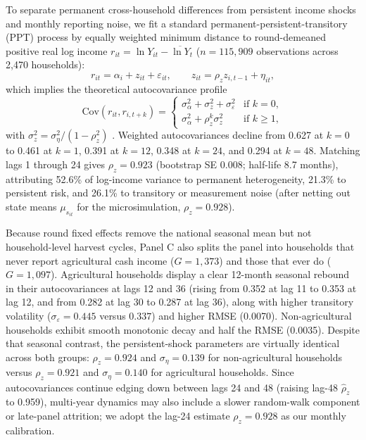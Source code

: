 \documentclass[11pt]{article}
\begin{document}
To separate permanent cross-household differences from persistent income shocks and monthly reporting noise, we fit a standard permanent-persistent-transitory (PPT) process by equally weighted minimum distance to round-demeaned positive real log income $r_{it} = \ln Y_{it} - \overline{\ln Y}_t$ ($n = 115{,}909$ observations across 2,470 households):
\begin{equation}\label{eq:ppt}
r_{it} = \alpha_i + z_{it} + \varepsilon_{it}, \qquad z_{it} = \rho_z z_{i,t-1} + \eta_{it},
\end{equation}
which implies the theoretical autocovariance profile
\begin{equation}\label{eq:autocov}
\text{Cov}(r_{it}, r_{i,t+k}) = \begin{cases}
\sigma_\alpha^2 + \sigma_z^2 + \sigma_\varepsilon^2 & \text{if } k = 0, \\
\sigma_\alpha^2 + \rho_z^k \sigma_z^2 & \text{if } k \ge 1,
\end{cases}
\end{equation}
with $\sigma_z^2 = \sigma_\eta^2 / (1 - \rho_z^2)$ \citep{blundell2008consumption,guvenen2009empirical}. Weighted autocovariances decline from 0.627 at $k = 0$ to 0.461 at $k = 1$, 0.391 at $k = 12$, 0.348 at $k = 24$, and 0.294 at $k = 48$. Matching lags 1 through 24 gives $\rho_z = 0.923$ (bootstrap SE 0.008; half-life 8.7 months), attributing 52.6\% of log-income variance to permanent heterogeneity, 21.3\% to persistent risk, and 26.1\% to transitory or measurement noise (after netting out state means $\mu_{s_{it}}$ for the microsimulation, $\rho_z = 0.928$).

Because round fixed effects remove the national seasonal mean but not household-level harvest cycles, Panel C also splits the panel into households that never report agricultural cash income ($G = 1{,}373$) and those that ever do ($G = 1{,}097$). Agricultural households display a clear 12-month seasonal rebound in their autocovariances at lags 12 and 36 (rising from 0.352 at lag 11 to 0.353 at lag 12, and from 0.282 at lag 30 to 0.287 at lag 36), along with higher transitory volatility ($\sigma_\varepsilon = 0.445$ versus $0.337$) and higher RMSE (0.0070). Non-agricultural households exhibit smooth monotonic decay and half the RMSE (0.0035). Despite that seasonal contrast, the persistent-shock parameters are virtually identical across both groups: $\rho_z = 0.924$ and $\sigma_\eta = 0.139$ for non-agricultural households versus $\rho_z = 0.921$ and $\sigma_\eta = 0.140$ for agricultural households. Since autocovariances continue edging down between lags 24 and 48 (raising lag-48 $\hat{\rho}_z$ to 0.959), multi-year dynamics may also include a slower random-walk component or late-panel attrition; we adopt the lag-24 estimate $\rho_z = 0.928$ as our monthly calibration.
\end{document}
